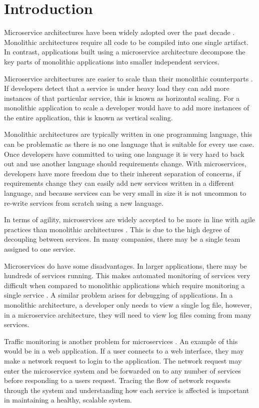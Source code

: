 \chapter{Introduction}

Microservice architectures have been widely adopted over the past decade \cite{7030212}. Monolithic architectures require all code to be compiled into one single artifact. In contrast, applications built using a microservice architecture decompose the key parts of monolithic applications into smaller independent services. 

Microservice architectures are easier to scale than their monolithic counterparts \cite{namiot2014micro}. If developers detect that a service is under heavy load they can add more instances of that particular service, this is known as horizontal scaling. For a monolithic application to scale a developer would have to add more instances of the entire application, this is known as vertical scaling. 

Monolithic architectures are typically written in one programming language, this can be problematic as there is no one language that is suitable for every use case. Once developers have committed to using one language it is very hard to back out and use another language should requirements change. With microservices, developers have more freedom due to their inherent separation of concerns, if requirements change they can easily add new services written in a different language, and because services can be very small in size it is not uncommon to re-write services from scratch using a new language.

In terms of agility, microservices are widely accepted to be more in line with agile practices than monolithic architectures \cite{larrucea2018microservices}. This is due to the high degree of decoupling between services. In many companies, there may be a single team assigned to one service.

Microservices do have some disadvantages. In larger applications, there may be hundreds of services running. This makes automated monitoring of services very difficult when compared to monolithic applications which require monitoring a single service \cite{mayer2017dashboard}. A similar problem arises for debugging of applications. In a monolithic architecture, a developer only needs to view a single log file, however, in a microservice architecture, they will need to view log files coming from many services. 

Traffic monitoring is another problem for microservices \cite{sun2015security}. An example of this would be in a web application. If a user connects to a web interface, they may make a network request to login to the application. The network request may enter the microservice system and be forwarded on to any number of services before responding to a users request. Tracing the flow of network requests through the system and understanding how each service is affected is important in maintaining a healthy, scalable system. 

